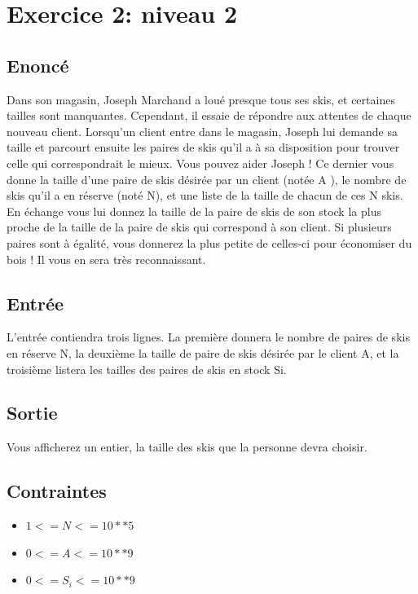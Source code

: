 \documentclass{article}
\begin{document}
    \section{Exercice 2: niveau 2}
        \subsection{Enoncé}
            Dans son magasin, Joseph Marchand a loué presque tous ses skis, et certaines tailles sont manquantes.
            Cependant, il essaie de répondre aux attentes de chaque nouveau client.
            Lorsqu’un client entre dans le magasin, Joseph lui demande sa taille et parcourt ensuite les paires de skis
            qu’il a à sa disposition pour trouver celle qui correspondrait le mieux. Vous pouvez aider Joseph !
            Ce dernier vous donne la taille d’une paire de skis désirée par un client (notée A ), le nombre de skis qu’il
            a en réserve (noté N), et une liste de la taille de chacun de ces N skis. En échange vous lui donnez la taille
            de la paire de skis de son stock la plus proche de la taille de la paire de skis qui correspond à son client. Si
            plusieurs paires sont à égalité, vous donnerez la plus petite de celles-ci pour économiser du bois ! Il vous en
            sera très reconnaissant.

        \subsection{Entrée}
            L’entrée contiendra trois lignes. La première donnera le nombre de paires de skis en réserve N, la deuxième
            la taille de paire de skis désirée par le client A, et la troisième listera les tailles des paires de skis en stock Si.
        
        \subsection{Sortie}
            Vous afficherez un entier, la taille des skis que la personne devra choisir.
        
        \subsection{Contraintes}
            \begin{itemize}
                \item $1 <= N <= 10 ** 5$
                \item $0 <= A <= 10 ** 9$
                \item $0 <= S_i <= 10 ** 9$
            \end{itemize}
\end{document}
